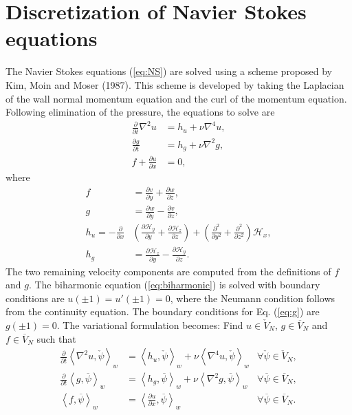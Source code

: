 \documentclass[11pt, oneside]{article}
\newcommand{\N}[1]{\check{#1}}
\newcommand{\D}[1]{\overline{#1}}
\begin{document}
\section{Discretization of Navier Stokes equations}
\label{sec:discretizationNS}
The Navier Stokes equations (\ref{eq:NS}) are solved using a scheme 
proposed by Kim, Moin and Moser (1987). This scheme is developed by taking the 
Laplacian of the wall normal momentum equation and the curl of the momentum 
equation. Following elimination of the pressure, the equations to solve are 
\begin{align}
\frac{\partial}{\partial t} \nabla^2 u &= h_u + \nu \nabla^4 u, 
\label{eq:biharmonic} \\
\frac{\partial g}{\partial t} &= h_g + \nu \nabla^2 g, \label{eq:g} \\
f + \frac{\partial u}{\partial x} &= 0, \label{eq:f}
\end{align}
where
\begin{align}
f &= \frac{\partial v}{\partial y} + \frac{\partial w}{\partial z}, \\
g &= \frac{\partial w}{\partial y} - \frac{\partial v}{\partial z}, \\
h_u = -\frac{\partial}{\partial x} &\left( \frac{\partial 
\mathcal{H}_y}{\partial y} + \frac{\partial \mathcal{H}_z}{\partial z} \right) 
+ \left(\frac{\partial^2}{\partial y^2} + \frac{\partial^2}{\partial z^2} 
\right) \mathcal{H}_x ,
\\
h_g &= \frac{\partial \mathcal{H}_z}{\partial y} - \frac{\partial 
\mathcal{H}_y}{\partial z}.
\end{align}
The two remaining velocity components are computed from the definitions of $f$ 
and $g$. The biharmonic equation (\ref{eq:biharmonic}) is solved with boundary 
conditions are $u(\pm 1) = u'(\pm 1) = 0$, where the Neumann condition follows 
from the continuity equation. The boundary conditions for Eq. (\ref{eq:g}) are 
$g(\pm 1) = 0$. The variational formulation becomes: Find ${u} \in 
\N{V}_N$, ${g} \in \D{V}_N$ and ${f} \in \D{V}_N$ such that
\begin{align}
	\frac{\partial }{\partial t} \left< \nabla^2 u, \N{\psi}\right>_w &= 
	\left<h_u, \N{\psi} \right>_w + \nu \left<\nabla^4u, \N{\psi}\right>_w 
	&\forall \N{\psi} \in \N{V}_N, \label{eq:u1} \\
	\frac{\partial}{\partial t}\left<g, \D{\psi}\right>_w &= \left<h_g, 
	\D{\psi}\right>_w + \nu 
	\left<\nabla^2 g, \D{\psi}\right>_w &\forall \D{\psi} \in \D{V}_N ,
	\label{eq:g1} \\
	\left<f, \D{\psi}\right>_w &= \left<\frac{\partial u}{\partial x}, 
	\D{\psi}\right>_w &\forall \D{\psi} \in \D{V}_N. \label{eq:f1}
\end{align}
\end{document}
